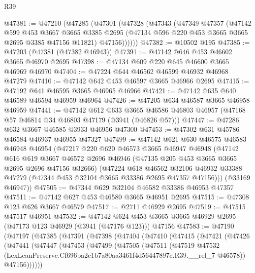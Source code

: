 \begin{lexlean}{R39}
\begin{coremodule}
@47381 := @47210
    (@47285
      (@47301
        (@47328
          (@47343
            (@47349
              @47357
              (@47142
                @599
                @453
                @3667
                @3665
                @3385
                @2695
                (@47134 @596 @220 @453 @3665 @3665 @2695 @3385 @47156 @11821)
                @47156))))))
@47382 := @10502 @195
@47385 := @47203 (@47381 (@47382 @46943))
@47391 := @47142 @646 @453 @46602 @3665 @46970 @2695
@47398 := @47134 @609 @220 @645 @46600 @3665 @46969 @46970
@47404 := @47224 @644 @46562 @46599 @46932 @46968 @47279
@47410 := @47142 @642 @453 @46597 @3665 @46966 @2695
@47415 := @47192 @641 @46595 @3665 @46965 @46966
@47421 := @47142 @635 @640 @46589 @46594 @46959 @46964
@47426 := @47205 @634 @46587 @3665 @46958 @46959
@47441 := @47142
    @612
    @633
    @3665
    @46586
    @46803
    @46957
    (@47168 @57 @46814 @34 @46803 @47179 (@3941 (@46826 @57)))
@47447 := @47286 @632 @3667 @46585 @3933 @46956 @47300
@47453 := @47302 @631 @45786 @46584 @46937 @46955 @47327
@47499 := @47142
    @621
    @630
    @46575
    @46583
    @46948
    @46954
    (@47217
      @220
      @620
      @46573
      @3665
      @46947
      @46948
      (@47142
        @616
        @619
        @3667
        @46572
        @2696
        @46946
        (@47135 @205 @453 @3665 @3665 @2695 @2696 @47156 @32666)
        (@47224
          @618
          @46562
          @32106
          @46932
          @33388
          @47279
          (@47344 @453 @32104 @3665 @33386 @2695 @47357 @47156)))
      (@33169 @46947))
@47505 := @47344 @629 @32104 @46582 @33386 @46953 @47357
@47511 := @47142 @627 @453 @46580 @3665 @46951 @2695
@47515 := @47308 @123 @626 @3667 @46579
@47517 := @2711 @46929 @2695
@47519 := @47515 @47517 @46951
@47532 := @47142
    @624
    @453
    @3665
    @3665
    @46929
    @2695
    (@47173 @123 @46929 (@3941 (@47176 @123)))
    @47156
@47583 := @47190
    (@47197
      (@47385
        (@47391
          (@47398
            (@47404
              (@47410
                (@47415
                  (@47421
                    (@47426
                      (@47441
                        (@47447
                          (@47453
                            (@47499
                              (@47505
                                (@47511
                                  (@47519
                                    @47532
                                    (LexLeanPreserve.Cf696ba2c1b7a80aa3461f4d56447897c.R39.__rel_7
                                      @46578))
                                  @47156))))))

\end{coremodule}
\end{lexlean}
